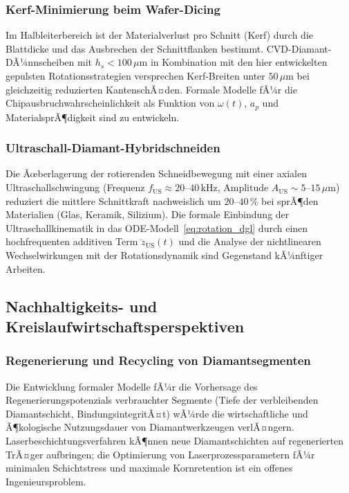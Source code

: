﻿\documentclass[a4paper,12pt]{article}
\theoremstyle{definition}
\begin{document}
\subsubsection{Kerf-Minimierung beim Wafer-Dicing}

Im Halbleiterbereich ist der Materialverlust pro Schnitt (Kerf) durch die
Blattdicke und das Ausbrechen der Schnittflanken bestimmt. CVD-Diamant-DÃ¼nnscheiben
mit $h_s < 100\,\mu\mathrm{m}$ in Kombination mit den hier entwickelten gepulsten
Rotationsstrategien versprechen Kerf-Breiten unter $50\,\mu\mathrm{m}$ bei gleichzeitig
reduzierten KantenschÃ¤den. Formale Modelle fÃ¼r die Chipausbruchwahrscheinlichkeit
als Funktion von $\omega(t)$, $a_p$ und MaterialsprÃ¶digkeit sind zu entwickeln.

\subsubsection{Ultraschall-Diamant-Hybridschneiden}

Die Ãœberlagerung der rotierenden Schneidbewegung mit einer axialen Ultraschallschwingung
(Frequenz $f_{\mathrm{US}} \approx 20$--$40\,\mathrm{kHz}$, Amplitude $A_{\mathrm{US}} \sim 5$--$15\,\mu\mathrm{m}$)
reduziert die mittlere Schnittkraft nachweislich um $20$--$40\,\%$ bei sprÃ¶den Materialien
(Glas, Keramik, Silizium). Die formale Einbindung der Ultraschallkinematik in das
ODE-Modell~\eqref{eq:rotation_dgl} durch einen hochfrequenten additiven Term
$\ddot{z}_{\mathrm{US}}(t)$ und die Analyse der nichtlinearen Wechselwirkungen mit
der Rotationsdynamik sind Gegenstand kÃ¼nftiger Arbeiten.

\subsection{Nachhaltigkeits- und Kreislaufwirtschaftsperspektiven}

\subsubsection{Regenerierung und Recycling von Diamantsegmenten}

Die Entwicklung formaler Modelle fÃ¼r die Vorhersage des Regenerierungspotenzials
verbrauchter Segmente (Tiefe der verbleibenden Diamantschicht, BindungsintegritÃ¤t)
wÃ¼rde die wirtschaftliche und Ã¶kologische Nutzungsdauer von Diamantwerkzeugen
verlÃ¤ngern. Laserbeschichtungsverfahren kÃ¶nnen neue Diamantschichten auf regenerierten
TrÃ¤ger aufbringen; die Optimierung von Laserprozessparametern fÃ¼r minimalen
Schichtstress und maximale Kornretention ist ein offenes Ingenieursproblem.
\end{document}
